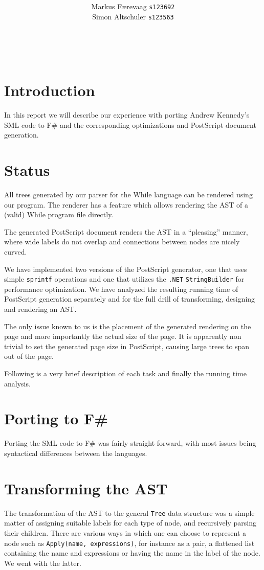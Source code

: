 \documentclass{article}
\title{\TITLE\\ {\large \COURSE}}
\date{\DATE}
\author{
  Markus Færevaag {\tt s123692}\\
  Simon Altschuler {\tt s123563}
}
\begin{document}
\maketitle
\vspace{10cm}
 \\
\clearpage


\section{Introduction}
In this report we will describe our experience with porting Andrew Kennedy's SML code to F\# and the corresponding optimizations and PostScript document generation.


\section{Status}
All trees generated by our parser for the While language can be rendered using our program. The renderer has a feature which allows rendering the AST of a (valid) While program file directly.

The generated PostScript document renders the AST in a ``pleasing'' manner, where wide labels do not overlap and connections between nodes are nicely curved.

We have implemented two versions of the PostScript generator, one that uses simple \texttt{sprintf} operations and one that utilizes the \texttt{.NET} \texttt{StringBuilder} for performance optimization. We have analyzed the resulting running time of PostScript generation separately and for the full drill of transforming, designing and rendering an AST.

The only issue known to us is the placement of the generated rendering on the page and more importantly the actual size of the page. It is apparently non trivial to set the generated page size in PostScript, causing large trees to span out of the page.

Following is a very brief description of each task and finally the running time analysis.


\section{Porting to F\#}
Porting the SML code to F\# was fairly straight-forward, with most issues being syntactical differences between the languages.


\section{Transforming the AST}
The transformation of the AST to the general \texttt{Tree} data structure was a simple matter of assigning suitable labels for each type of node, and recursively parsing their children. There are various ways in which one can choose to represent a node such as \texttt{Apply(name, expressions)}, for instance as a pair, a flattened list containing the name and expressions or having the name in the label of the node. We went with the latter.
\end{document}

